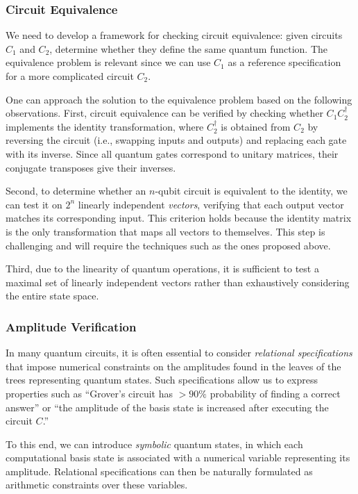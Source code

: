 \subsubsection{Circuit Equivalence}
\label{equivalence:task}
We need to develop a framework for checking circuit equivalence: given circuits $C_1$ and $C_2$, determine whether they define the same quantum function.
%
The equivalence problem is relevant since we can use $C_1$ as a reference specification for a more complicated circuit $C_2$.
%

One can approach the solution to the equivalence problem based on the following observations.
%
First, circuit equivalence can be verified by checking whether $C_1C_2^\dag$ implements the identity transformation, where $C_2^\dag$ is obtained from $C_2$ by reversing the circuit (i.e., swapping inputs and outputs) and replacing each gate with its inverse.
%
Since all quantum gates correspond to unitary matrices, their conjugate transposes give their inverses.
%

Second, to determine whether an $n$-qubit circuit is equivalent to the identity, we can test it on $2^n$ linearly independent \emph{vectors}, verifying that each output vector matches its corresponding input.
%
This criterion holds because the identity matrix is the only transformation that maps all vectors to themselves.
%
This step is challenging and will require the techniques such as the ones proposed above.
%

Third, due to the linearity of quantum operations, it is sufficient to test a maximal set of linearly independent vectors rather than exhaustively considering the entire state space.
%

\subsubsection{Amplitude Verification}
In many quantum circuits, it is often essential to consider \textit{relational specifications} that impose numerical constraints on the amplitudes found in the leaves of the trees representing quantum states.
%
Such specifications allow us to express properties such as ``Grover's circuit has ${>}90\%$ probability of finding a correct answer'' or ``the amplitude of the basis state is increased after executing the circuit $C$.'' 
%

To this end, we can introduce \textit{symbolic} quantum states, in which each computational basis state is associated with a numerical variable representing its amplitude.
%
Relational specifications can then be naturally formulated as arithmetic constraints over these variables.
%

